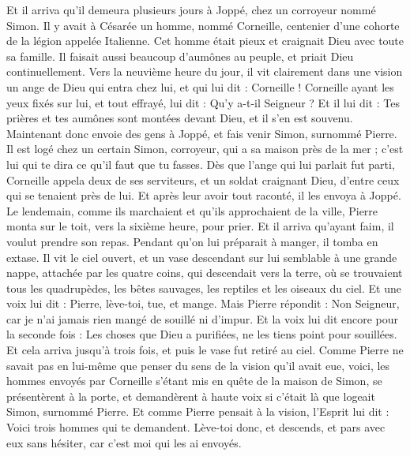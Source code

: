 \begin{multicols}{2}
Et il arriva qu'il demeura plusieurs jours à Joppé, chez un corroyeur nommé Simon.
\VerseOne{}Il y avait à Césarée un homme, nommé Corneille, centenier d'une cohorte de la légion appelée Italienne.
Cet homme était pieux et craignait Dieu avec toute sa famille. Il faisait aussi beaucoup d'aumônes au peuple, et priait Dieu continuellement.
Vers la neuvième heure du jour, il vit clairement dans une vision un ange de Dieu qui entra chez lui, et qui lui dit : Corneille !
Corneille ayant les yeux fixés sur lui, et tout effrayé, lui dit : Qu'y a-t-il Seigneur ? Et il lui dit : Tes prières et tes aumônes sont montées devant Dieu, et il s’en est souvenu.
Maintenant donc envoie des gens à Joppé, et fais venir Simon, surnommé Pierre.
Il est logé chez un certain Simon, corroyeur, qui a sa maison près de la mer ; c'est lui qui te dira ce qu'il faut que tu fasses.
Dès que l'ange qui lui parlait fut parti, Corneille appela deux de ses serviteurs, et un soldat craignant Dieu, d'entre ceux qui se tenaient près de lui.
Et après leur avoir tout raconté, il les envoya à Joppé.
Le lendemain, comme ils marchaient et qu'ils approchaient de la ville, Pierre monta sur le toit, vers la sixième heure, pour prier.
Et il arriva qu'ayant faim, il voulut prendre son repas. Pendant qu’on lui préparait à manger, il tomba en extase.
Il vit le ciel ouvert, et un vase descendant sur lui semblable à une grande nappe, attachée par les quatre coins, qui descendait vers la terre,
où se trouvaient tous les quadrupèdes, les bêtes sauvages, les reptiles et les oiseaux du ciel.
Et une voix lui dit : Pierre, lève-toi, tue, et mange.
Mais Pierre répondit : Non Seigneur, car je n’ai jamais rien mangé de souillé ni d’impur.
Et la voix lui dit encore pour la seconde fois : Les choses que Dieu a purifiées, ne les tiens point pour souillées.
Et cela arriva jusqu’à trois fois, et puis le vase fut retiré au ciel.
Comme Pierre ne savait pas en lui-même que penser du sens de la vision qu’il avait eue, voici, les hommes envoyés par Corneille s’étant mis en quête de la maison de Simon, se présentèrent à la porte,
et demandèrent à haute voix si c’était là que logeait Simon, surnommé Pierre.
Et comme Pierre pensait à la vision, l'Esprit lui dit : Voici trois hommes qui te demandent.
Lève-toi donc, et descends, et pars avec eux sans hésiter, car c'est moi qui les ai envoyés.

\end{multicols}
